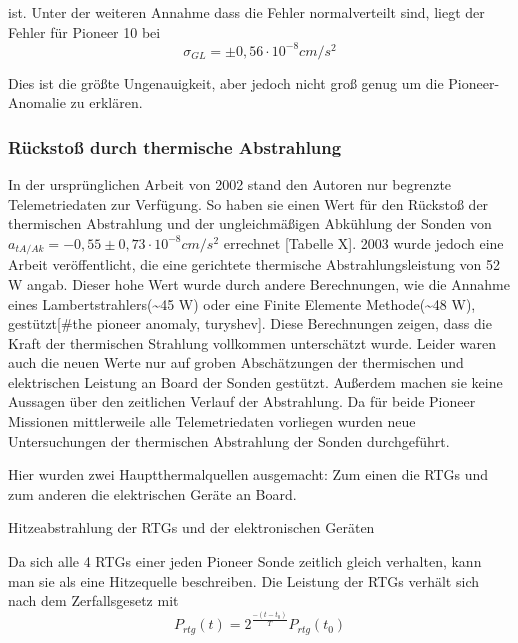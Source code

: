 ist. Unter der weiteren Annahme dass die Fehler normalverteilt sind,
liegt der Fehler f\"ur Pioneer 10 bei
\begin{equation}
\sigma _{\mathit{GL}}=\pm 0,56\cdot 10^{-8}\mathit{cm}/s^{2}
\end{equation}

Dies ist die gr\"o{\ss}te Ungenauigkeit, aber jedoch nicht gro{\ss}
genug um die Pioneer-Anomalie zu erkl\"aren.


\bigskip

\subsubsection{R\"ucksto{\ss} durch thermische Abstrahlung}

In der urspr\"unglichen Arbeit von 2002 \cite{Anderson2002} stand den Autoren nur
begrenzte Telemetriedaten zur Verf\"ugung. So haben sie einen Wert
f\"ur den R\"ucksto{\ss} der thermischen Abstrahlung und der
ungleichm\"a{\ss}igen Abk\"uhlung der Sonden von 
$a_{\mathit{tA}/\mathit{Ak}}=-0,55\pm 0,73\cdot
10^{-8}\mathit{cm}/s^{2}$ errechnet \cite{Anderson2002}[Tabelle X]. 2003 wurde jedoch
eine Arbeit ver\"offentlicht, die eine gerichtete thermische
Abstrahlungsleistung von 52 W angab. Dieser hohe Wert wurde durch
andere Berechnungen, wie die Annahme eines Lambertstrahlers(\~{}45 W)
oder eine Finite Elemente Methode(\~{}48 W), gest\"utzt[\#the pioneer
anomaly, turyshev]. Diese Berechnungen zeigen, dass die Kraft der
thermischen Strahlung vollkommen untersch\"atzt wurde. Leider waren
auch die neuen Werte nur auf groben Absch\"atzungen der thermischen und
elektrischen Leistung an Board der Sonden gest\"utzt. Au{\ss}erdem
machen sie keine Aussagen \"uber den zeitlichen Verlauf der
Abstrahlung. Da f\"ur beide Pioneer Missionen mittlerweile alle
Telemetriedaten vorliegen wurden neue Untersuchungen der thermischen
Abstrahlung der Sonden durchgef\"uhrt.

Hier wurden zwei Hauptthermalquellen ausgemacht: Zum einen die RTGs und
zum anderen die elektrischen Ger\"ate an Board.


\bigskip

Hitzeabstrahlung der RTGs und der elektronischen Ger\"aten %

Da sich alle 4 RTGs einer jeden Pioneer Sonde zeitlich gleich verhalten,
kann man sie als eine Hitzequelle beschreiben. Die Leistung der RTGs
verh\"alt sich nach dem Zerfallsgesetz mit 
\begin{equation}
P_{\mathit{rtg}}(t)=2^{\frac{-(t-t_{0})}{T}}P_{\mathit{rtg}}(t_{0})
\end{equation}

